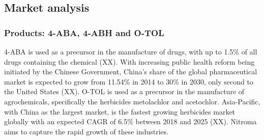 
\subsection{Market analysis}
\subsubsection{Products: 4-ABA, 4-ABH and O-TOL}
4-ABA is used as a precursor in the manufacture of drugs, with up to 1.5\% of all drugs containing the chemical (XX). With increasing public health reform being initiated by the Chinese Government, China’s share of the global pharmaceutical market is expected to grow from 11.54\% in 2014 to 30\% in 2030, only second to the United States (XX). O-TOL is used as a precursor in the manufacture of agrochemicals, specifically the herbicides metolachlor and acetochlor. Asia-Pacific, with China as the largest market, is the fastest growing herbicides market globally with an expected CAGR of 6.5\% between 2018 and 2025 (XX). Nitroma aims to capture the rapid growth of these industries. 
